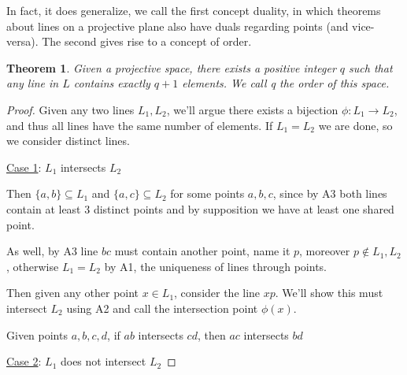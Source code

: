 \documentclass[12pt]{article}
\newtheorem{theorem}{Theorem}
\begin{document}
    In fact, it does generalize, we call the first concept duality,
    in which theorems about lines on a projective plane also have duals regarding points (and vice-versa).
    The second gives rise to a concept of order\cite[p. 24]{beutelspacher_projective_1998}.

    \begin{theorem}
        Given a projective space, there exists a positive integer $q$ such that any line in $L$ contains exactly $q+1$ elements.
        We call q the order of this space.
    \end{theorem}

    \begin{proof}
        Given any two lines $L_1, L_2$, we'll argue there exists a bijection $\phi: L_1 \rightarrow L_2$,
        and thus all lines have the same number of elements.
        If $L_1 = L_2$ we are done, so we consider distinct lines.

        \underline{Case 1}: $L_1$ intersects $L_2$

        Then $\{a, b\} \subseteq L_1$ and $\{a, c\} \subseteq L_2$ for some points $a,b,c$,
        since by A3 both lines contain at least 3 distinct points and by supposition we have at least one shared point.

        As well, by A3 line $bc$ must contain another point, name it $p$, moreover $p \notin L_1, L_2$,
        otherwise $L_1 = L_2$ by A1, the uniqueness of lines through points.

        Then given any other point $x \in L_1$, consider the line $xp$.
        We'll show this must intersect $L_2$ using A2 and call the intersection point $\phi(x)$.

        \begin{figure}[h]
            \centering
            \label{fig:intersecting_lines}
        \end{figure}

        Given points $a,b,c,d$, if $ab$ intersects $cd$, then $ac$ intersects $bd$

        \underline{Case 2}: $L_1$ does not intersect $L_2$
    \end{proof}
\end{document}
